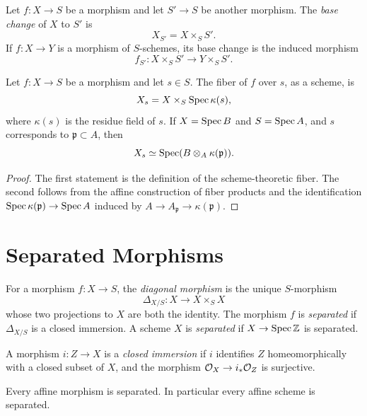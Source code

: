 \begin{definition}
Let \(f:X\to S\) be a morphism and let \(S'\to S\) be another morphism.  The
\emph{base change} of \(X\) to \(S'\) is
\[
    X_{S'}=X\times_S S'.
\]
If \(f:X\to Y\) is a morphism of \(S\)-schemes, its base change is the induced
morphism
\[
    f_{S'}:X\times_S S'\longrightarrow Y\times_S S'.
\]
\end{definition}

\begin{proposition}
Let \(f:X\to S\) be a morphism and let \(s\in S\).  The fiber of \(f\) over
\(s\), as a scheme, is
\[
    X_s=X\times_S \operatorname{Spec} \kappa(s),
\]
where \(\kappa(s)\) is the residue field of \(s\).  If \(X=\operatorname{Spec} B\) and
\(S=\operatorname{Spec} A\), and \(s\) corresponds to \(\mathfrak p\subset A\), then
\[
    X_s\simeq \operatorname{Spec}(B\otimes_A \kappa(\mathfrak p)).
\]
\end{proposition}

\begin{proof}
The first statement is the definition of the scheme-theoretic fiber.  The
second follows from the affine construction of fiber products and the
identification \(\operatorname{Spec}\kappa(\mathfrak p)\to\operatorname{Spec} A\) induced by
\(A\to A_{\mathfrak p}\to\kappa(\mathfrak p)\).
\end{proof}

\section{Separated Morphisms}

\begin{definition}
For a morphism \(f:X\to S\), the \emph{diagonal morphism} is the unique
\(S\)-morphism
\[
    \Delta_{X/S}:X\longrightarrow X\times_S X
\]
whose two projections to \(X\) are both the identity.  The morphism \(f\) is
\emph{separated} if \(\Delta_{X/S}\) is a closed immersion.  A scheme \(X\) is
\emph{separated} if \(X\to\operatorname{Spec}\mathbb{Z}\) is separated.
\end{definition}

\begin{definition}
A morphism \(i:Z\to X\) is a \emph{closed immersion} if \(i\) identifies \(Z\)
homeomorphically with a closed subset of \(X\), and the morphism
\(\mathcal{O}_X\to i_*\mathcal{O}_Z\) is surjective.
\end{definition}

\begin{proposition}
Every affine morphism is separated.  In particular every affine scheme is
separated.
\end{proposition}

